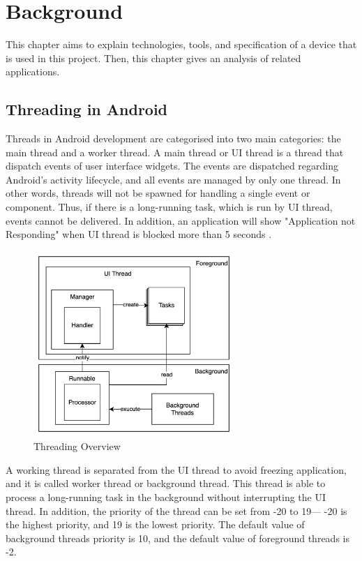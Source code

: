 \chapter{Background}\label{background}

    This chapter aims to explain technologies, tools, and specification of a device that is used in this project.
    Then, this chapter gives an analysis of related applications.

    \section{Threading in Android}
        Threads in Android development are categorised into two main categories: the main thread and a worker thread.
        A main thread or UI thread is a thread that dispatch events of user interface widgets.
        The events are dispatched regarding Android's activity lifecycle,
        and all events are managed by only one thread.
        In other words, threads will not be spawned for handling a single event or component.
        Thus, if there is a long-running task, which is run by UI thread, events cannot be delivered.
        In addition, an application will show "Application not Responding"
        when UI thread is blocked more than 5 seconds \cite{ANDROID-01}.

        \begin{figure}[!ht]
            \centering
            \includegraphics[width=3in]{images/chapter2/thread-overview.png}
            \caption{Threading Overview}
            \label{thread-overview}
        \end{figure}

        A working thread is separated from the UI thread to avoid freezing application,
            and it is called worker thread or background thread.
            This thread is able to process a long-running task in the background without interrupting the UI thread.
        In addition, the priority of the thread can be set from -20 to 19--- -20
            is the highest priority, and 19 is the lowest priority.
            The default value of background threads priority is 10,
            and the default value of foreground threads is -2.

